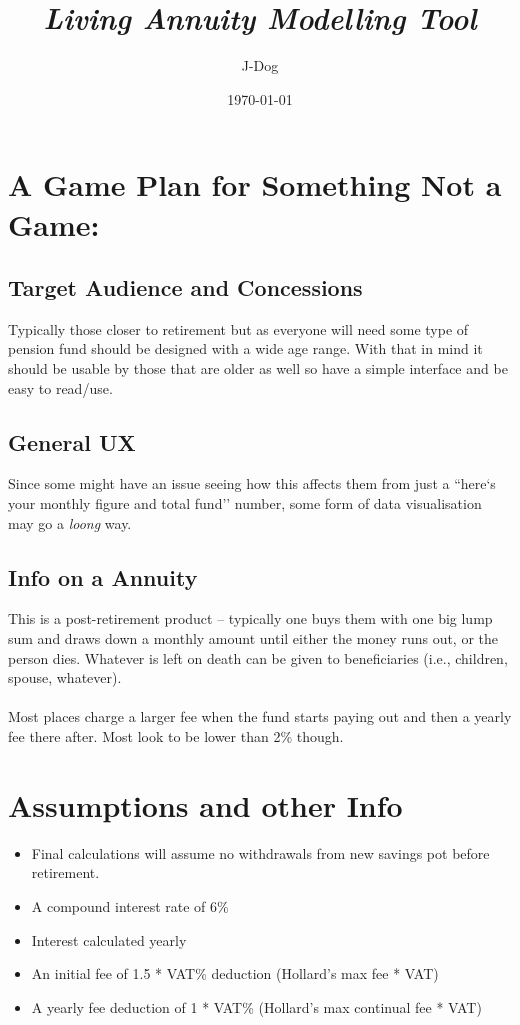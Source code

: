 \documentclass[a4paper, 11pt]{article}
\title{\huge \textbf{\textit{Living Annuity Modelling Tool}}}
\author{J-Dog}
\date{\today}
\begin{document}
\maketitle
\section*{A Game Plan for Something Not a Game:}
\subsection*{Target Audience and Concessions}
Typically those closer to retirement but as everyone will need some type of pension fund should be designed with a wide age range. With that in mind it should be usable by those that are older as well so have a simple interface and be easy to read/use.

\subsection*{General UX}
Since some might have an issue seeing how this affects them from just a ``here`s your monthly figure and total fund'' number, some form of data visualisation may go a \textit{loong} way.

\subsection*{Info on a Annuity}
This is a post-retirement product – typically one buys them with one big lump sum and draws down a monthly amount until either the money runs out, or the person dies. Whatever is left on death can be given to beneficiaries (i.e., children, spouse, whatever).
\\\\
Most places charge a larger fee when the fund starts paying out and then a yearly fee there after. Most look to be lower than 2\% though.

\section*{Assumptions and other Info}
\begin{itemize}
\item Final calculations will assume no withdrawals from new savings pot before retirement.
\item A compound interest rate of 6\%
\item Interest calculated yearly
\item An initial fee of 1.5 * VAT\% deduction (Hollard's max fee * VAT)
\item A yearly fee deduction of 1 * VAT\% (Hollard's max continual fee * VAT)
\end{itemize}
\end{document}
